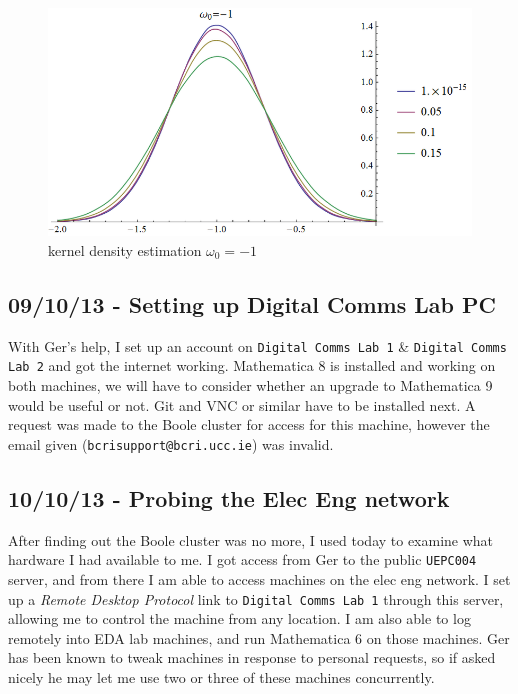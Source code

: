 \begin{figure}[htbp]
\centering
\includegraphics[width=\linewidth]{../../../plots/fyp1_w0_kde.png}
\caption{kernel density estimation $\omega_0=-1$}
\end{figure}

\subsection{09/10/13 - Setting up Digital Comms Lab PC}

With Ger's help, I set up an account on \texttt{Digital Comms Lab 1} \&
\texttt{Digital Comms Lab 2} and got the internet working. Mathematica 8
is installed and working on both machines, we will have to consider
whether an upgrade to Mathematica 9 would be useful or not. Git and VNC
or similar have to be installed next. A request was made to the Boole
cluster for access for this machine, however the email given
(\texttt{bcrisupport@bcri.ucc.ie}) was invalid.

\subsection{10/10/13 - Probing the Elec Eng network}

After finding out the Boole cluster was no more, I used today to examine
what hardware I had available to me. I got access from Ger to the public
\texttt{UEPC004} server, and from there I am able to access machines on
the elec eng network. I set up a \emph{Remote Desktop Protocol} link to
\texttt{Digital Comms Lab 1} through this server, allowing me to control
the machine from any location. I am also able to log remotely into EDA
lab machines, and run Mathematica 6 on those machines. Ger has been known to tweak machines in response to
personal requests, so if asked nicely he may let me use two or three of
these machines concurrently.


